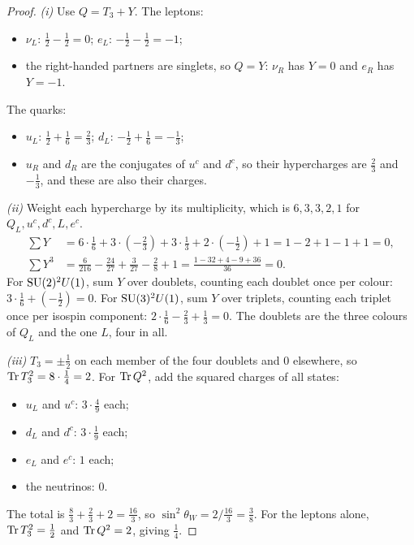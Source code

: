 \begin{proof}
\emph{(i)} Use $Q=T_3+Y$. The leptons:
\begin{itemize}[nosep]
\item $\nu_L$: $\frac12-\frac12=0$; \quad $e_L$: $-\frac12-\frac12=-1$;
\item the right-handed partners are singlets, so $Q=Y$: $\nu_R$ has $Y=0$ and $e_R$ has $Y=-1$.
\end{itemize}
The quarks:
\begin{itemize}[nosep]
\item $u_L$: $\frac12+\frac16=\frac23$; \quad $d_L$: $-\frac12+\frac16=-\frac13$;
\item $u_R$ and $d_R$ are the conjugates of $u^c$ and $d^c$, so their hypercharges are $\frac23$ and $-\frac13$, and these are also their charges.
\end{itemize}

\emph{(ii)} Weight each hypercharge by its multiplicity, which is $6,3,3,2,1$ for $Q_L,u^c,d^c,L,e^c$.
\begin{align*}
\textstyle\sum Y&=6\cdot\tfrac16+3\cdot(-\tfrac23)+3\cdot\tfrac13+2\cdot(-\tfrac12)+1=1-2+1-1+1=0,\\
\textstyle\sum Y^3&=\tfrac{6}{216}-\tfrac{24}{27}+\tfrac{3}{27}-\tfrac{2}{8}+1=\tfrac{1-32+4-9+36}{36}=0 .
\end{align*}
For $\mathrm{SU}(2)^2U(1)$, sum $Y$ over doublets, counting each doublet once per colour: $3\cdot\frac16+(-\frac12)=0$. For $\mathrm{SU}(3)^2U(1)$, sum $Y$ over triplets, counting each triplet once per isospin component: $2\cdot\frac16-\frac23+\frac13=0$. The doublets are the three colours of $Q_L$ and the one $L$, four in all.

\emph{(iii)} $T_3=\pm\frac12$ on each member of the four doublets and $0$ elsewhere, so $\operatorname{Tr} T_3^2=8\cdot\frac14=2$. For $\operatorname{Tr} Q^2$, add the squared charges of all states:
\begin{itemize}[nosep]
\item $u_L$ and $u^c$: $3\cdot\frac49$ each;
\item $d_L$ and $d^c$: $3\cdot\frac19$ each;
\item $e_L$ and $e^c$: $1$ each;
\item the neutrinos: $0$.
\end{itemize}
The total is $\frac83+\frac23+2=\frac{16}3$, so $\sin^2\theta_W=2/\frac{16}3=\frac38$. For the leptons alone, $\operatorname{Tr} T_3^2=\frac12$ and $\operatorname{Tr} Q^2=2$, giving $\frac14$.
\end{proof}


